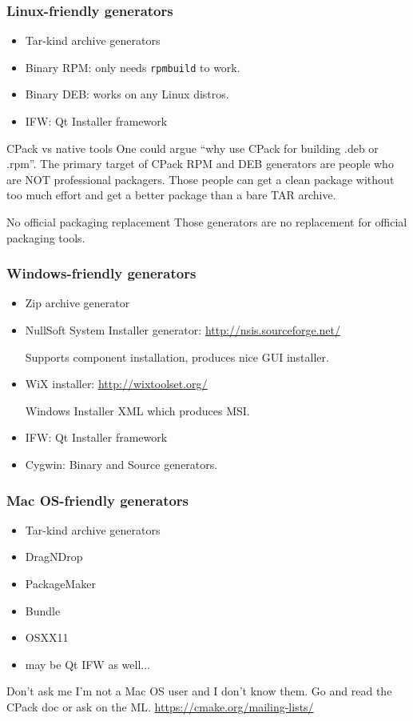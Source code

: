 \documentclass[compress,slidestop,table,usepdftitle=false
              ]
               {beamer}
\newcommand{\fname}[1]{\texttt{#1}}
\begin{document}
\begin{frame}[allowframebreaks]
\frametitle{Linux-friendly generators}
\begin{itemize}
\item Tar-kind archive generators
\item Binary RPM: only needs \fname{rpmbuild} to work.
\item Binary DEB: works on any Linux distros.
\item IFW: Qt Installer framework
\end{itemize}
\begin{block}{CPack vs native tools}
One could argue ``why use CPack for building .deb or .rpm''.
The primary target of CPack RPM and DEB generators are people who are NOT
professional packagers.
Those people can get a clean package without too much effort and get
a better package than a bare TAR archive.
\end{block}
\begin{alertblock}{No official packaging replacement}
Those generators are \alert{no replacement} for official packaging tools.
\end{alertblock}
\end{frame}

\begin{frame}
\frametitle{Windows-friendly generators}
\begin{itemize}
\item Zip archive generator
\item NullSoft System Installer generator: \url{http://nsis.sourceforge.net/}

      Supports component installation, produces nice GUI installer.
\item WiX installer: \url{http://wixtoolset.org/}

  Windows Installer XML which produces MSI.
\item IFW: Qt Installer framework
\item Cygwin: Binary and Source generators.
\end{itemize}
\end{frame}

\begin{frame}
\frametitle{Mac OS-friendly generators}
\begin{multicols}{2}
\begin{itemize}
\item Tar-kind archive generators
\item DragNDrop
\item PackageMaker
\item Bundle
\item OSXX11
\item may be Qt IFW as well...
\end{itemize}
\end{multicols}
\begin{alertblock}{Don't ask me}
I'm not a Mac OS user and I don't know them.
Go and read the CPack doc or ask on the ML.
\url{https://cmake.org/mailing-lists/}
\end{alertblock}
\end{frame}
\end{document}
